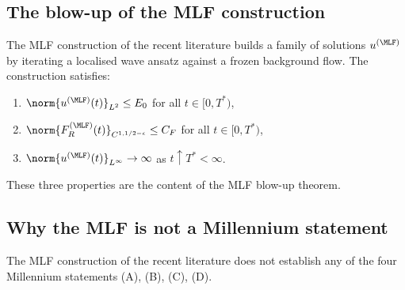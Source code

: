 \subsection{The blow-up of the MLF construction}
\label{part-3:ssec:MLF-blowup}

The MLF construction of the recent literature builds a family of 
solutions $u^{(\MLF)}$ by iterating a localised wave ansatz against a 
frozen background flow. The construction satisfies:
\begin{enumerate}[label=(\roman*),leftmargin=*]
\item $\norm{u^{(\MLF)}(t)}_{L^2}\leq E_0$ for all $t\in[0,T^\ast)$,
\item $\norm{F_R^{(\MLF)}(t)}_{C^{1,1/2-\epsilon}}\leq C_F$ for all 
      $t\in[0,T^\ast)$,
\item $\norm{u^{(\MLF)}(t)}_{L^\infty}\to\infty$ as 
      $t\uparrow T^\ast<\infty$.
\end{enumerate}
These three properties are the content of the MLF blow-up theorem.

\subsection{Why the MLF is not a Millennium statement}
\label{part-3:ssec:MLF-not-clay}

\begin{proposition}\label{part-3:prop:MLF-not-clay}
The MLF construction of the recent literature does not establish any 
of the four Millennium statements (A), (B), (C), (D).
\end{proposition}

